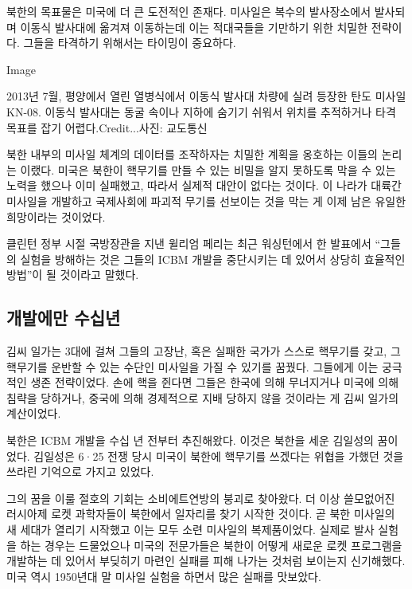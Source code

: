북한의 목표물은 미국에 더 큰 도전적인 존재다. 미사일은 복수의
발사장소에서 발사되며 이동식 발사대에 옮겨져 이동하는데 이는 적대국들을
기만하기 위한 치밀한 전략이다. 그들을 타격하기 위해서는 타이밍이
중요하다.

Image

2013년 7월, 평양에서 열린 열병식에서 이동식 발사대 차량에 실려 등장한
탄도 미사일 KN-08. 이동식 발사대는 동굴 속이나 지하에 숨기기 쉬워서
위치를 추적하거나 타격 목표를 잡기 어렵다.Credit...사진: 교도통신

북한 내부의 미사일 체계의 데이터를 조작하자는 치밀한 계획을 옹호하는
이들의 논리는 이랬다. 미국은 북한이 핵무기를 만들 수 있는 비밀을 알지
못하도록 막을 수 있는 노력을 했으나 이미 실패했고, 따라서 실제적 대안이
없다는 것이다. 이 나라가 대륙간 미사일을 개발하고 국제사회에 파괴적
무기를 선보이는 것을 막는 게 이제 남은 유일한 희망이라는 것이었다.

클린턴 정부 시절 국방장관을 지낸 윌리엄 페리는 최근 워싱턴에서 한
발표에서 ``그들의 실험을 방해하는 것은 그들의 ICBM 개발을 중단시키는 데
있어서 상당히 효율적인 방법''이 될 것이라고 말했다.

\hypertarget{uxac1cuxbc1cuxc5d0uxb9cc-uxc218uxc2eduxb144}{%
\subsection{개발에만
수십년}\label{uxac1cuxbc1cuxc5d0uxb9cc-uxc218uxc2eduxb144}}

김씨 일가는 3대에 걸쳐 그들의 고장난, 혹은 실패한 국가가 스스로 핵무기를
갖고, 그 핵무기를 운반할 수 있는 수단인 미사일을 가질 수 있기를 꿈꿨다.
그들에게 이는 궁극적인 생존 전략이었다. 손에 핵을 쥔다면 그들은 한국에
의해 무너지거나 미국에 의해 침략을 당하거나, 중국에 의해 경제적으로 지배
당하지 않을 것이라는 게 김씨 일가의 계산이었다.

북한은 ICBM 개발을 수십 년 전부터 추진해왔다. 이것은 북한을 세운
김일성의 꿈이었다. 김일성은 6·25 전쟁 당시 미국이 북한에 핵무기를
쓰겠다는 위협을 가했던 것을 쓰라린 기억으로 가지고 있었다.

그의 꿈을 이룰 절호의 기회는 소비에트연방의 붕괴로 찾아왔다. 더 이상
쓸모없어진 러시아제 로켓 과학자들이 북한에서 일자리를 찾기 시작한
것이다. 곧 북한 미사일의 새 세대가 열리기 시작했고 이는 모두 소련
미사일의 복제품이었다. 실제로 발사 실험을 하는 경우는 드물었으나 미국의
전문가들은 북한이 어떻게 새로운 로켓 프로그램을 개발하는 데 있어서
부딪히기 마련인 실패를 피해 나가는 것처럼 보이는지 신기해했다. 미국 역시
1950년대 말 미사일 실험을 하면서 많은 실패를 맛보았다.

